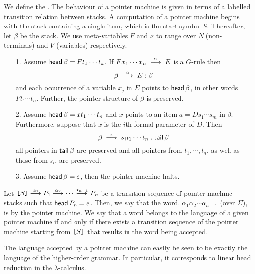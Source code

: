 We define the . The behaviour
of a pointer machine is given in terms of a labelled transition
relation between stacks. A computation of a pointer machine begins
with the stack containing a single item, which is the start symbol
$S$. Thereafter, let $\beta$ be the stack. We use meta-variables
$F$ and $x$ to range over $N$ (non-terminals) and $V$ (variables)
respectively.
\begin{itemize}
\item[1.] Assume ${\sf head}\,{\beta} = F t_1 \cdots t_n$. If $F x_1
\cdots  x_n \; \stackrel{{\alpha}}{\longrightarrow} \; E$ is a $G$-rule then
\[\beta \; \stackrel{{\alpha}}{\longrightarrow} \; E: \beta \]
and each occurrence of a variable $x_j$ in $E$ points to
${\sf head}\,{\beta}$, in other words $F t_1 \cdots t_n$. Further, the
pointer structure of $\beta$ is preserved.

\item[2.] Assume ${\sf head}\,{\beta} = x  t_1  \cdots  t_n$ and
$x$ points to an item $a = D s_1 \cdots s_m$
in $\beta$. Furthermore, suppose that $x$ is the $i$th formal
parameter of $D$. Then
\[ \beta \; \stackrel{{\epsilon}}{\longrightarrow} \; s_i t_1  \cdots  t_n : {\sf tail}\,{\beta}\]
all pointers in ${\sf tail}\,{\beta}$ are preserved and all pointers from $t_1,
\cdots, t_n$, as well as those from $s_i$, are preserved.


\item[3.] Assume ${\sf head}\,{\beta} = e$, then the pointer machine halts.
\end{itemize}

Let $\hbox{\tt [} S \hbox{\tt ]} \stackrel{{\alpha_1}}{\longrightarrow} P_1 \stackrel{{\alpha_2}}{\longrightarrow} \cdots
\stackrel{{\alpha_{n-1}}}{\longrightarrow} P_n$ be a transition sequence of pointer machine
stacks such that ${\sf head}\,{P}_n = e$. Then, we say that the word,
$\alpha_1 \alpha_2 \cdots \alpha _{n-1}$ (over $\Sigma$), is  by
the pointer machine. We say that a word belongs to the language of
a given pointer machine if and only if there exists a transition
sequence of the pointer machine starting from $\hbox{\tt [} S \hbox{\tt ]}$
that results in the word being accepted.

The language accepted by a pointer machine can easily be seen to
be exactly the language of the higher-order grammar. In
particular, it corresponds to linear head reduction in the
$\lambda$-calculus.

